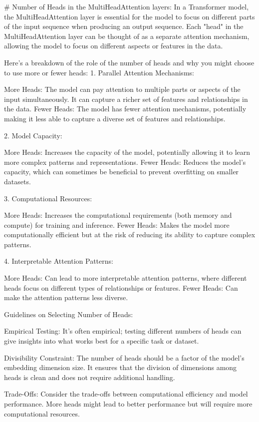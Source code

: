 # Number of Heads in the MultiHeadAttention layers: 
In a Transformer model, the MultiHeadAttention layer is essential for the model to focus on different parts of the input sequence when producing an output sequence. Each "head" in the MultiHeadAttention layer can be thought of as a separate attention mechanism, allowing the model to focus on different aspects or features in the data.

Here’s a breakdown of the role of the number of heads and why you might choose to use more or fewer heads:
1. Parallel Attention Mechanisms:

    More Heads: The model can pay attention to multiple parts or aspects of the input simultaneously. It can capture a richer set of features and relationships in the data.
    Fewer Heads: The model has fewer attention mechanisms, potentially making it less able to capture a diverse set of features and relationships.

2. Model Capacity:

    More Heads: Increases the capacity of the model, potentially allowing it to learn more complex patterns and representations.
    Fewer Heads: Reduces the model’s capacity, which can sometimes be beneficial to prevent overfitting on smaller datasets.

3. Computational Resources:

    More Heads: Increases the computational requirements (both memory and compute) for training and inference.
    Fewer Heads: Makes the model more computationally efficient but at the risk of reducing its ability to capture complex patterns.

4. Interpretable Attention Patterns:

    More Heads: Can lead to more interpretable attention patterns, where different heads focus on different types of relationships or features.
    Fewer Heads: Can make the attention patterns less diverse.

Guidelines on Selecting Number of Heads:

    Empirical Testing: It's often empirical; testing different numbers of heads can give insights into what works best for a specific task or dataset.

    Divisibility Constraint: The number of heads should be a factor of the model’s embedding dimension size. It ensures that the division of dimensions among heads is clean and does not require additional handling.

    Trade-Offs: Consider the trade-offs between computational efficiency and model performance. More heads might lead to better performance but will require more computational resources.

